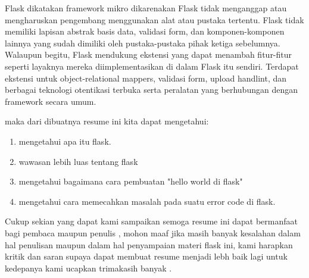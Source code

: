 Flask dikatakan framework mikro dikarenakan Flask tidak menganggap atau mengharuskan pengembang menggunakan alat atau pustaka tertentu. Flask tidak memiliki lapisan abstrak basis data, validasi form, dan komponen-komponen lainnya yang sudah dimiliki oleh pustaka-pustaka pihak ketiga sebelumnya. Walaupun begitu, Flask mendukung ekstensi yang dapat menambah fitur-fitur seperti layaknya mereka diimplementasikan di dalam Flask itu sendiri. Terdapat ekstensi untuk object-relational mappers, validasi form, upload handlint, dan berbagai teknologi otentikasi terbuka serta peralatan yang berhubungan dengan framework secara umum\cite{solihin2016implementasi}. 

maka dari dibuatnya resume ini kita dapat mengetahui: 
	
\begin{enumerate}
\item mengetahui apa itu flask.
\item wawasan lebih luas tentang flask
\item mengetahui bagaimana cara pembuatan "hello world di flask"
\item mengetahui cara memecahkan masalah pada suatu error code di flask.
\end{enumerate}	


Cukup sekian yang dapat kami sampaikan semoga resume ini dapat bermanfaat bagi pembaca maupun penulis , mohon maaf jika masih banyak kesalahan dalam hal penulisan maupun dalam hal penyampaian materi flask ini, kami harapkan kritik dan saran supaya dapat membuat resume menjadi lebh baik lagi untuk kedepanya kami ucapkan trimakasih banyak  .




